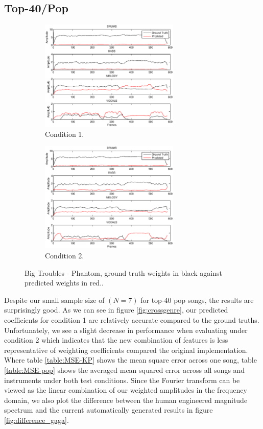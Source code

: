 \documentclass{article}
\begin{document}
\subsection{Top-40/Pop}
\label{sec:top40}

\begin{figure}[!htbp]
\centering
\begin{subfigure}{\columnwidth}
\includegraphics[height=200px, width=\columnwidth]{Plot_1_1.eps}%
\caption{Condition 1.}
\label{subfiga}%
\end{subfigure}%
\begin{subfigure}{\columnwidth}
\includegraphics[height=200px, width=\columnwidth]{Plot_1.eps}%
\caption{Condition 2.}
\label{subfigb}%
\end{subfigure}%
\caption{Big Troubles - Phantom, ground truth weights in black against predicted weights in red..}
\label{fig:bigtroubles}
\end{figure}

Despite our small sample size of $(N = 7)$ for top-40 pop songs, the results are surprisingly good.  As we can see in figure \ref{fig:crossgenre}, our predicted coefficients for condition 1 are relatively accurate compared to the ground truths.  Unfortunately, we see a slight decrease in performance when evaluating under condition 2 which indicates that the new combination of features is less representative of weighting coefficients compared the original implementation.  Where table \ref{table:MSE-KP} shows the mean square error across one song, table \ref{table:MSE-pop} shows the averaged mean squared error across all songs and instruments under both test conditions.  Since the Fourier transform can be viewed as the linear combination of our weighted amplitudes in the frequency domain, we also plot the difference between the human engineered magnitude spectrum and the current automatically generated results in figure \ref{fig:difference_gaga}.
\end{document}
